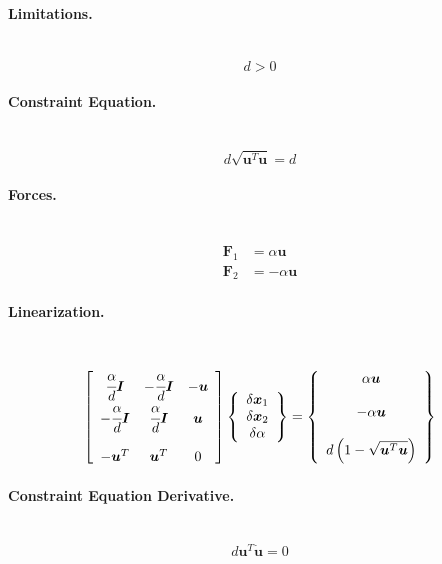 \documentclass[10pt,dvips,fleqn,subeqn]{report}
\newcommand{\T}[1]{\bm{#1}}
\begin{document}
\paragraph{Limitations.} \
\begin{equation}
	d > 0
\end{equation}

\paragraph{Constraint Equation.} \
\begin{equation}
	d \sqrt{\T{u}^T \T{u}} = d
\end{equation}

\paragraph{Forces.} \
\begin{subequations}
\begin{align}
	\T{F}_1 &= \alpha \T{u} \\
	\T{F}_2 &= -\alpha \T{u}
\end{align}
\end{subequations}

\paragraph{Linearization.} \
\begin{equation}
	\sqbr{\matr{ccc}{
		\cfrac{\alpha}{d}\T{I} & -\cfrac{\alpha}{d}\T{I} & -\T{u} \\
		-\cfrac{\alpha}{d}\T{I} & \cfrac{\alpha}{d}\T{I} & \T{u} \\
		\\
		-\T{u}^T & \T{u}^T & 0
	}}\cubr{\cvvect{
		\delta\T{x}_1 \\
		\delta\T{x}_2 \\
		\delta\alpha
	}} = \cubr{\cvvect{
		\alpha \T{u} \\
		\\
		- \alpha \T{u} \\
		\\
		d\plbr{1 - \sqrt{\T{u}^T \T{u}}}
	}}
\end{equation}

\paragraph{Constraint Equation Derivative.} \
\begin{equation}
	d \T{u}^T \dot{\T{u}} = 0
\end{equation}
\end{document}
